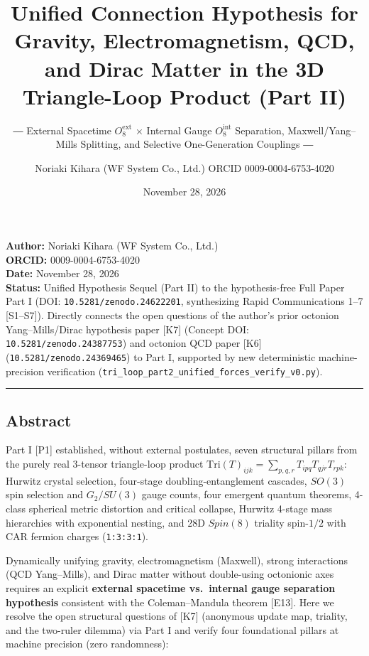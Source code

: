 \documentclass[
  a4paper,
]{article}
\title{Unified Connection Hypothesis for Gravity, Electromagnetism, QCD,
and Dirac Matter in the 3D Triangle-Loop Product (Part II)}
\subtitle{― External Spacetime \(O_8^{\mathrm{ext}}\) × Internal Gauge
\(O_8^{\mathrm{int}}\) Separation, Maxwell/Yang--Mills Splitting, and
Selective One-Generation Couplings ―}
\author{Noriaki Kihara (WF System Co., Ltd.) ORCID 0009-0004-6753-4020}
\date{November 28, 2026}
\begin{document}
\maketitle

{
\setcounter{tocdepth}{2}
\tableofcontents
}
\textbf{Author:} Noriaki Kihara (WF System Co., Ltd.)\\
\textbf{ORCID:} 0009-0004-6753-4020\\
\textbf{Date:} November 28, 2026\\
\textbf{Status:} Unified Hypothesis Sequel (Part II) to the
hypothesis-free Full Paper Part I (DOI:
\texttt{10.5281/zenodo.24622201}, synthesizing Rapid Communications 1--7
{[}S1--S7{]}). Directly connects the open questions of the author's
prior octonion Yang--Mills/Dirac hypothesis paper {[}K7{]} (Concept DOI:
\texttt{10.5281/zenodo.24387753}) and octonion QCD paper {[}K6{]}
(\texttt{10.5281/zenodo.24369465}) to Part I, supported by new
deterministic machine-precision verification
(\texttt{tri\_loop\_part2\_unified\_forces\_verify\_v0.py}).

\begin{center}\rule{0.5\linewidth}{0.5pt}\end{center}

\subsection{Abstract}\label{abstract}

Part I {[}P1{]} established, without external postulates, seven
structural pillars from the purely real 3-tensor triangle-loop product
\(\mathrm{Tri}(T)_{ijk} = \sum_{p,q,r} T_{ipq} T_{qjr} T_{rpk}\):
Hurwitz crystal selection, four-stage doubling-entanglement cascades,
\(SO(3)\) spin selection and \(G_2/SU(3)\) gauge counts, four emergent
quantum theorems, 4-class spherical metric distortion and critical
collapse, Hurwitz 4-stage mass hierarchies with exponential nesting, and
28D \(Spin(8)\) triality spin-\(1/2\) with CAR fermion charges
(\texttt{1:3:3:1}).

Dynamically unifying gravity, electromagnetism (Maxwell), strong
interactions (QCD Yang--Mills), and Dirac matter without double-using
octonionic axes requires an explicit \textbf{external spacetime
vs.~internal gauge separation hypothesis} consistent with the
Coleman--Mandula theorem {[}E13{]}. Here we resolve the open structural
questions of {[}K7{]} (anonymous update map, triality, and the two-ruler
dilemma) via Part I and verify four foundational pillars at machine
precision (zero randomness):
\end{document}
